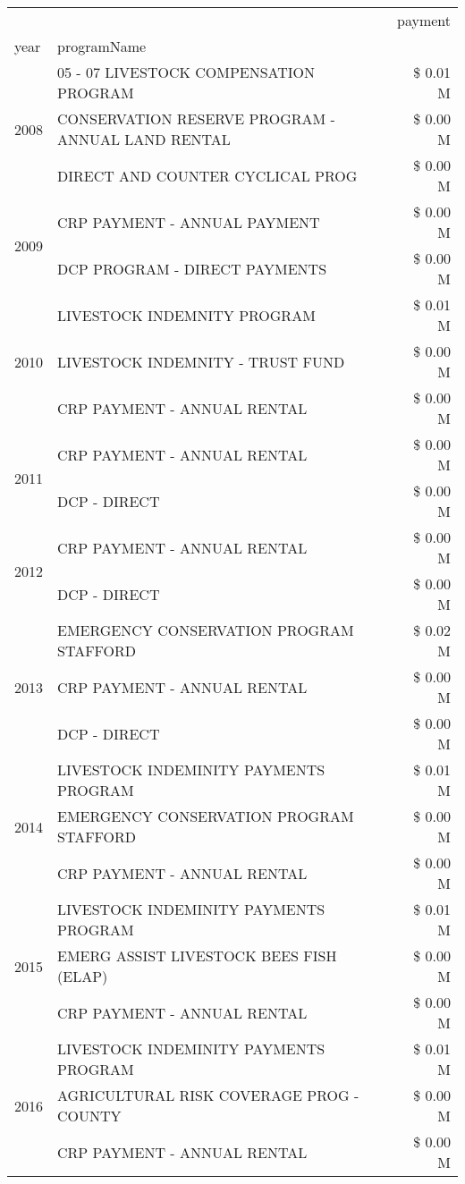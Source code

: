 \begin{tabular}{llr}
\toprule
 &  & payment \\
year & programName &  \\
\midrule
\multirow[t]{3}{*}{2008} & 05 - 07 LIVESTOCK COMPENSATION PROGRAM & \$ 0.01 M \\
 & CONSERVATION RESERVE PROGRAM - ANNUAL LAND RENTAL & \$ 0.00 M \\
 & DIRECT AND COUNTER CYCLICAL PROG & \$ 0.00 M \\
\cline{1-3}
\multirow[t]{2}{*}{2009} & CRP PAYMENT - ANNUAL PAYMENT & \$ 0.00 M \\
 & DCP PROGRAM - DIRECT PAYMENTS & \$ 0.00 M \\
\cline{1-3}
\multirow[t]{3}{*}{2010} & LIVESTOCK INDEMNITY PROGRAM & \$ 0.01 M \\
 & LIVESTOCK INDEMNITY - TRUST FUND & \$ 0.00 M \\
 & CRP PAYMENT - ANNUAL RENTAL & \$ 0.00 M \\
\cline{1-3}
\multirow[t]{2}{*}{2011} & CRP PAYMENT - ANNUAL RENTAL & \$ 0.00 M \\
 & DCP - DIRECT & \$ 0.00 M \\
\cline{1-3}
\multirow[t]{2}{*}{2012} & CRP PAYMENT - ANNUAL RENTAL & \$ 0.00 M \\
 & DCP - DIRECT & \$ 0.00 M \\
\cline{1-3}
\multirow[t]{3}{*}{2013} & EMERGENCY CONSERVATION PROGRAM STAFFORD & \$ 0.02 M \\
 & CRP PAYMENT - ANNUAL RENTAL & \$ 0.00 M \\
 & DCP - DIRECT & \$ 0.00 M \\
\cline{1-3}
\multirow[t]{3}{*}{2014} & LIVESTOCK INDEMINITY PAYMENTS PROGRAM & \$ 0.01 M \\
 & EMERGENCY CONSERVATION PROGRAM STAFFORD & \$ 0.00 M \\
 & CRP PAYMENT - ANNUAL RENTAL & \$ 0.00 M \\
\cline{1-3}
\multirow[t]{3}{*}{2015} & LIVESTOCK INDEMINITY PAYMENTS PROGRAM & \$ 0.01 M \\
 & EMERG ASSIST LIVESTOCK BEES FISH (ELAP) & \$ 0.00 M \\
 & CRP PAYMENT - ANNUAL RENTAL & \$ 0.00 M \\
\cline{1-3}
\multirow[t]{3}{*}{2016} & LIVESTOCK INDEMINITY PAYMENTS PROGRAM & \$ 0.01 M \\
 & AGRICULTURAL RISK COVERAGE PROG - COUNTY & \$ 0.00 M \\
 & CRP PAYMENT - ANNUAL RENTAL & \$ 0.00 M \\

\end{tabular}

